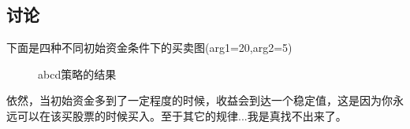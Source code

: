 \documentclass{ctexart}
\begin{document}
	\subsection{讨论}
	下面是四种不同初始资金条件下的买卖图(arg1=20,arg2=5)
	\begin{figure}[H]
		\centering
	\end{figure}
	\begin{figure}[H]
		\centering
	\end{figure}
	\begin{figure}[H]
		\centering
	\end{figure}
	\begin{figure}[H]
		\centering
		\caption{abcd策略的结果}
	\end{figure}
	依然，当初始资金多到了一定程度的时候，收益会到达一个稳定值，这是因为你永远可以在该买股票的时候买入。至于其它的规律...我是真找不出来了。
\end{document}
